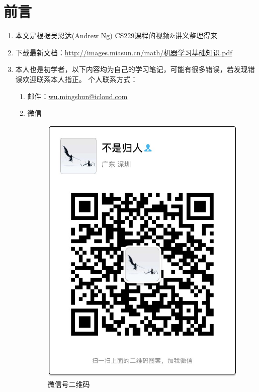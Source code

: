 \section{前言}
\begin{enumerate}
	\item 本文是根据吴恩达(Andrew Ng) CS229课程的视频\&讲义整理得来
	\item 下载最新文档：\href{http://images.miasun.cn/math/机器学习基础知识.pdf}{http://images.miasun.cn/math/机器学习基础知识.pdf}
	\item 本人也是初学者，以下内容均为自己的学习笔记，可能有很多错误，若发现错误欢迎联系本人指正。
	个人联系方式：
	\begin{enumerate}
		\item 邮件：\href{mailto:wu.mingshun@icloud.com}{wu.mingshun@icloud.com}
		\item 微信
		\begin{figure}[htbp]
			\centering
			\includegraphics[scale=0.25]{images/微信号二维码}
			\caption{微信号二维码}
		\end{figure}
	\end{enumerate}
	
\end{enumerate}




























